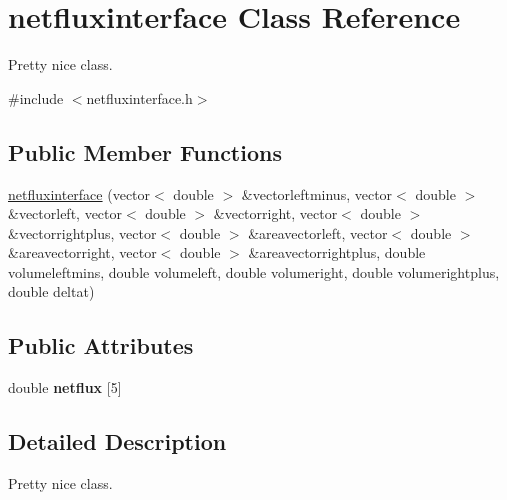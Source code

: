 \hypertarget{classnetfluxinterface}{}\section{netfluxinterface Class Reference}
\label{classnetfluxinterface}


Pretty nice class.  




{\ttfamily \#include $<$netfluxinterface.\+h$>$}

\subsection*{Public Member Functions}
\begin{DoxyCompactItemize}
\item 
\hyperlink{classnetfluxinterface_aac433a72c0cf5ac533b3c628a175ea2d}{netfluxinterface} (vector$<$ double $>$ \&vectorleftminus, vector$<$ double $>$ \&vectorleft, vector$<$ double $>$ \&vectorright, vector$<$ double $>$ \&vectorrightplus, vector$<$ double $>$ \&areavectorleft, vector$<$ double $>$ \&areavectorright, vector$<$ double $>$ \&areavectorrightplus, double volumeleftmins, double volumeleft, double volumeright, double volumerightplus, double deltat)
\end{DoxyCompactItemize}
\subsection*{Public Attributes}
\begin{DoxyCompactItemize}
\item 
double {\bfseries netflux} \mbox{[}5\mbox{]}\hypertarget{classnetfluxinterface_ae37d870ec03027c37915e528ec57f465}{}\label{classnetfluxinterface_ae37d870ec03027c37915e528ec57f465}

\end{DoxyCompactItemize}


\subsection{Detailed Description}
Pretty nice class. 

